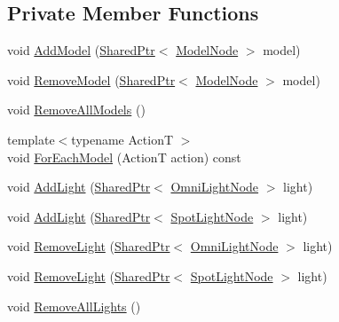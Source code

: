 \subsection*{Private Member Functions}
\begin{DoxyCompactItemize}
\item 
void \hyperlink{classmage_1_1_world_a6417b38aee49db5ffac610b2c77f84a5}{Add\+Model} (\hyperlink{namespacemage_a1e01ae66713838a7a67d30e44c67703e}{Shared\+Ptr}$<$ \hyperlink{namespacemage_a3086b6de2ec7ebd59d8b0bdc57195760}{Model\+Node} $>$ model)
\item 
void \hyperlink{classmage_1_1_world_a14a4c76bc0c0806166e4cc713c404211}{Remove\+Model} (\hyperlink{namespacemage_a1e01ae66713838a7a67d30e44c67703e}{Shared\+Ptr}$<$ \hyperlink{namespacemage_a3086b6de2ec7ebd59d8b0bdc57195760}{Model\+Node} $>$ model)
\item 
void \hyperlink{classmage_1_1_world_af3bae7b62192de9edda5e0567b73be93}{Remove\+All\+Models} ()
\item 
{\footnotesize template$<$typename ActionT $>$ }\\void \hyperlink{classmage_1_1_world_a8f9c130a358f6ce687d2948f477d4ef2}{For\+Each\+Model} (ActionT action) const
\item 
void \hyperlink{classmage_1_1_world_aeccf98417c78fc59b9662d73a4d14baf}{Add\+Light} (\hyperlink{namespacemage_a1e01ae66713838a7a67d30e44c67703e}{Shared\+Ptr}$<$ \hyperlink{namespacemage_a5d71843ded3749108547eba2a5ce4d85}{Omni\+Light\+Node} $>$ light)
\item 
void \hyperlink{classmage_1_1_world_a224000e03aded05bbb846d17a89a61a0}{Add\+Light} (\hyperlink{namespacemage_a1e01ae66713838a7a67d30e44c67703e}{Shared\+Ptr}$<$ \hyperlink{namespacemage_ab9f49a82dd438032bb38c5436a657335}{Spot\+Light\+Node} $>$ light)
\item 
void \hyperlink{classmage_1_1_world_ab6b1c1c73bea2167277ef4dc21867eca}{Remove\+Light} (\hyperlink{namespacemage_a1e01ae66713838a7a67d30e44c67703e}{Shared\+Ptr}$<$ \hyperlink{namespacemage_a5d71843ded3749108547eba2a5ce4d85}{Omni\+Light\+Node} $>$ light)
\item 
void \hyperlink{classmage_1_1_world_abd02b5bf5960e152c272086d364508fa}{Remove\+Light} (\hyperlink{namespacemage_a1e01ae66713838a7a67d30e44c67703e}{Shared\+Ptr}$<$ \hyperlink{namespacemage_ab9f49a82dd438032bb38c5436a657335}{Spot\+Light\+Node} $>$ light)
\item 
void \hyperlink{classmage_1_1_world_a5fafe529414d511e88b98ccd8e2f951f}{Remove\+All\+Lights} ()
\item 

\end{DoxyCompactItemize}

